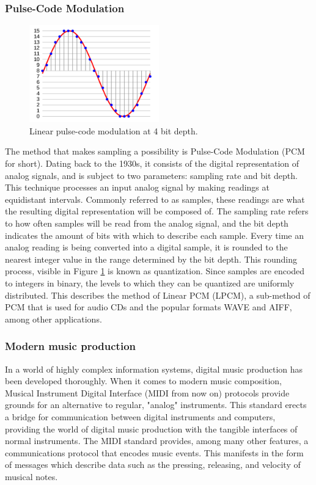 \documentclass[12pt, a4paper, hidelinks]{article}
\begin{document}
	\subsubsection{Pulse-Code Modulation}
	\begin{figure}[h]
		\centering
		\includegraphics[width=0.5\textwidth]{pcm.png}
		\caption{Linear pulse-code modulation at 4 bit depth. \cite{pcm_img}}
		\label{fig:pcm}
	\end{figure}
	The method that makes sampling a possibility is Pulse-Code Modulation (PCM for short). Dating back to the 1930s, it consists of the digital representation of analog signals, and is subject to two parameters: sampling rate and bit depth. This technique processes an input analog signal by making readings at equidistant intervals. Commonly referred to as samples, these readings are what the resulting digital representation will be composed of. The sampling rate refers to how often samples will be read from the analog signal, and the bit depth indicates the amount of bits with which to describe each sample. Every time an analog reading is being converted into a digital sample, it is rounded to the nearest integer value in the range determined by the bit depth. This rounding process, visible in Figure \ref{fig:pcm} is known as quantization. Since samples are encoded to integers in binary, the levels to which they can be quantized are uniformly distributed. This describes the method of Linear PCM (LPCM), a sub-method of PCM that is used for audio CDs and the popular formats WAVE and AIFF, among other applications.\par
	

	
	\subsubsection{Modern music production} 	
 	In a world of highly complex information systems, digital music production has been developed thoroughly. When it comes to modern music composition, Musical Instrument Digital Interface (MIDI from now on) protocols provide grounds for an alternative to regular, "analog" instruments. This standard erects a bridge for communication between digital instruments and computers, providing the world of digital music production with the tangible interfaces of normal instruments. The MIDI standard provides, among many other features, a communications protocol that encodes music events. This manifests in the form of messages which describe data such as the pressing, releasing, and velocity of musical notes. 	
	 	
\end{document}
